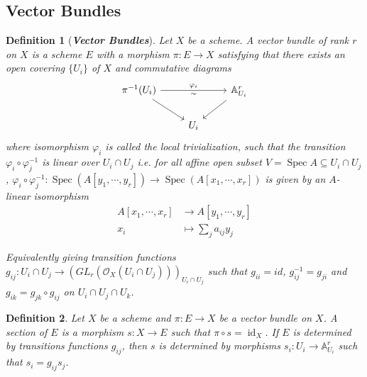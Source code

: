 \documentclass{ctexart}
\newtheorem{definition}{Definition}[section]
\newcommand{\identity}{\operatorname{id}}
\newcommand{\spec}{\operatorname{Spec}}
\begin{document}
\subsection{Vector Bundles}
\begin{definition}[\textbf{\emph{Vector Bundles}}]
    Let $X$ be a scheme.
    A vector bundle of rank $r$ on $X$ is a scheme $E$ with a morphism $\pi: E \longrightarrow X$ satisfying that there exists an open covering $\{U_{i}\}$ of $X$ and commutative diagrams
    \begin{equation*}
        \begin{tikzcd}
            \pi^{-1}(U_{i}) \arrow[rr, "\varphi_{i}", "\sim" swap] \arrow[dr] &&
            \mathbb{A}_{U_{i}}^{r} \arrow[dl] \\
            & U_{i} &
        \end{tikzcd}
    \end{equation*}
    where isomorphism $\varphi_{i}$ is called the local trivialization, 
    such that the transition $\varphi_{i} \circ \varphi_{j}^{-1}$ is linear over $U_{i} \cap U_{j}$ i.e. for all affine open subset $V = \spec A \subseteq U_{i} \cap U_{j}$,
    $\varphi_{i} \circ \varphi_{j}^{-1}: \spec(A[y_{1}, \cdots, y_{r}]) \longrightarrow \spec(A[x_{1}, \cdots, x_{r}])$ is given by an $A$-linear isomorphism
    \begin{equation*}
        \begin{split}
            A[x_{1}, \cdots, x_{r}] & \longrightarrow A[y_{1}, \cdots, y_{r}] \\
            x_{i} & \longmapsto \sum_{j}a_{ij}y_{j}
        \end{split}
    \end{equation*}
    \par
    Equivalently giving transition functions $g_{ij}: U_{i} \cap U_{j} \longrightarrow (GL_{r}(\mathcal{O}_{X}(U_{i} \cap U_{j})))_{U_{i} \cap U_{j}}$ such that 
    $g_{ii} = id$, $g_{ij}^{-1} = g_{ji}$ and $g_{ik} = g_{jk} \circ g_{ij}$ on $U_{i} \cap U_{j} \cap U_{k}$.
\end{definition}
\begin{definition}
    Let $X$ be a scheme and $\pi: E \longrightarrow X$ be a vector bundle on $X$.
    A section of $E$ is a morphism $s: X \longrightarrow E$ such that $\pi \circ s = \identity_{X}$.
    If $E$ is determined by transitions functions $g_{ij}$, then $s$ is determined by morphisms $s_{i}: U_{i} \longrightarrow \mathbb{A}_{U_{i}}^{r}$ such that $s_{i} = g_{ij}s_{j}$.
\end{definition}
\end{document}

